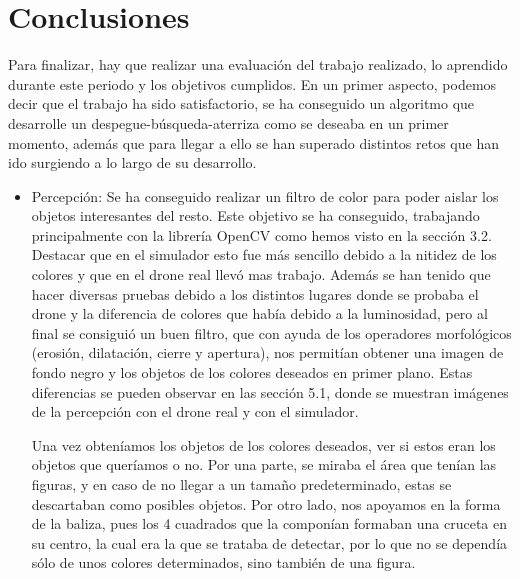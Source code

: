 \chapter{Conclusiones}\label{cap.conclusiones}

\hspace{1cm} Para finalizar, hay que realizar una evaluaci\'on del trabajo realizado, lo aprendido durante este periodo y los objetivos cumplidos. En un primer aspecto, podemos decir que el trabajo ha sido satisfactorio, se ha conseguido un algoritmo que desarrolle un despegue-b\'usqueda-aterriza como se deseaba en un primer momento, adem\'as que para llegar a ello se han superado distintos retos que han ido surgiendo a lo largo de su desarrollo.

\begin{itemize}
\item{Percepci\'on:} Se ha conseguido realizar un filtro de color para poder aislar los objetos interesantes del resto. Este objetivo se ha conseguido, trabajando principalmente con la librer\'ia OpenCV como hemos visto en la secci\'on 3.2. Destacar que en el simulador esto fue m\'as sencillo debido a la nitidez de los colores y que en el drone real llev\'o mas trabajo. Adem\'as se han tenido que hacer diversas pruebas debido a los distintos lugares donde se probaba el drone y la diferencia de colores que hab\'ia debido a la luminosidad, pero al final se consigui\'o un buen filtro, que con ayuda de los operadores morfol\'ogicos (erosi\'on, dilataci\'on, cierre y apertura), nos permit\'ian obtener una imagen de fondo negro y los objetos de los colores deseados en primer plano. Estas diferencias se pueden observar en las secci\'on 5.1, donde se muestran im\'agenes de la percepci\'on con el drone real y con el simulador.

\hspace{1cm} Una vez obten\'iamos los objetos de los colores deseados, ver si estos eran los objetos que quer\'iamos o no. Por una parte, se miraba el \'area que ten\'ian las figuras, y en caso de no llegar a un tamaño predeterminado, estas se descartaban como posibles objetos. Por otro lado, nos apoyamos en la forma de la baliza, pues los 4 cuadrados que la compon\'ian formaban una cruceta en su centro, la cual era la que se trataba de detectar, por lo que no se depend\'ia s\'olo de unos colores determinados, sino tambi\'en de una figura. 


\end{itemize}
